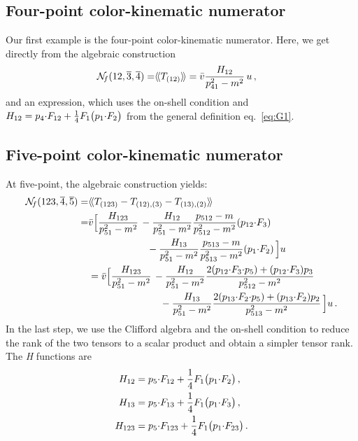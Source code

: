 \documentclass[a4paper,12pt]{article}
\makeatletter
\def\nn{\nonumber}
\newcommand{\la}{\langle\!\langle}
\newcommand{\ra}{\rangle\!\rangle}
\newcommand{\mdot}{{\cdot}}
\newcommand*{\bigcdot}{}%
\DeclareRobustCommand*{\bigcdot}{%
  \mathbin{\mathpalette\bigcdot@{}}%
}
\newcommand*{\bigcdot@scalefactor}{.6}
\newcommand*{\bigcdot@widthfactor}{1.25}
\newcommand*{\bigcdot@}[2]{%
  \sbox0{$#1\vcenter{}$}%
  \sbox2{$#1\cdot\m@th$}%
  \hbox to \bigcdot@widthfactor\wd2{%
    \hfil
    \raise\ht0\hbox{%
      \scalebox{\bigcdot@scalefactor}{%
        \lower\ht0\hbox{$#1\bullet\m@th$}%
      }%
    }%
    \hfil
  }%
}
\newcommand{\dd}{\bigcdot}
\makeatother
\begin{document}
\subsection{Four-point color-kinematic numerator}
Our first example is the four-point color-kinematic numerator. Here, we get directly from the algebraic construction 
 \begin{align}
    {\mathcal{N}}_{\!f}(12,\overline{3},\overline{4})=& \la T_{(12)}\ra =\bar v\dd  {H_{12}\over p^2_{41}-m^2}\, 
\dd u \, ,
\end{align} 
and an expression, which uses the on-shell condition and $H_{12}=p_4\mdot F_{12} + {1\over 4}F_1\dd \big(p_1 \mdot F_{2}\big)$ from the general definition eq.~\eqref{eq:G1}. 

\subsection{Five-point color-kinematic numerator}
At five-point, the algebraic construction yields:
%
   \begin{align}
    {\mathcal{N}}_{\!f}(123,\overline{4},\overline{5})=& \la T_{(123)}-T_{(12),(3)}-T_{(13),(2)}\ra \nn \\
    =&\bar v\dd \Big[ {H_{123}\over p^2_{51}-m^2}\, 
 -{H_{12}\over p^2_{51}-m^2}\dd {p_{512}-m\over p^2_{512}-m^2}\dd (p_{12}\mdot F_3)\,\nn\\
 &~~~~~~~~~~~~~~~~~~-{H_{13}\over p^2_{51}-m^2}\dd {p_{513}-m\over p^2_{513}-m^2}\dd (p_{1}\mdot F_2)\, \Big]
\dd u \, \nn\\
&=\bar v\dd \Big[ {H_{123}\over p^2_{51}-m^2}\, -{H_{12}\over p^2_{51}-m^2}\dd {2(p_{12}\mdot F_{3}\mdot p_{5})+(p_{12}\mdot F_{3})\dd p_{3} \over p^2_{512}-m^2}\nn\\
 &~~~~~~~~~~~~~~~~~~~~~~- {H_{13}\over p^2_{51}-m^2}\dd {2(p_{13}\mdot F_{2}\mdot p_{5})+(p_{13}\mdot F_{2})\dd p_{2}\over p^2_{513}-m^2}\, \Big]
\dd u \, .
\end{align} 
In the last step, we use the Clifford algebra and the on-shell condition to reduce the rank of the two tensors to a scalar product and obtain a simpler tensor rank. The {\it H} functions are  
\begin{align}
H_{12}&=p_5\mdot F_{12} + {1\over 4}F_1\dd \big(p_1 \mdot F_{2}\big)\, ,\nn\\
	H_{13}&=p_5\mdot F_{13} + {1\over 4}F_1\dd \big(p_1 \mdot F_{3}\big)\, , \nn\\
	H_{123}&=p_5\mdot F_{123} + {1\over 4}F_1\dd \big(p_1 \mdot F_{23}\big)\, .
\end{align}
%
\end{document}
